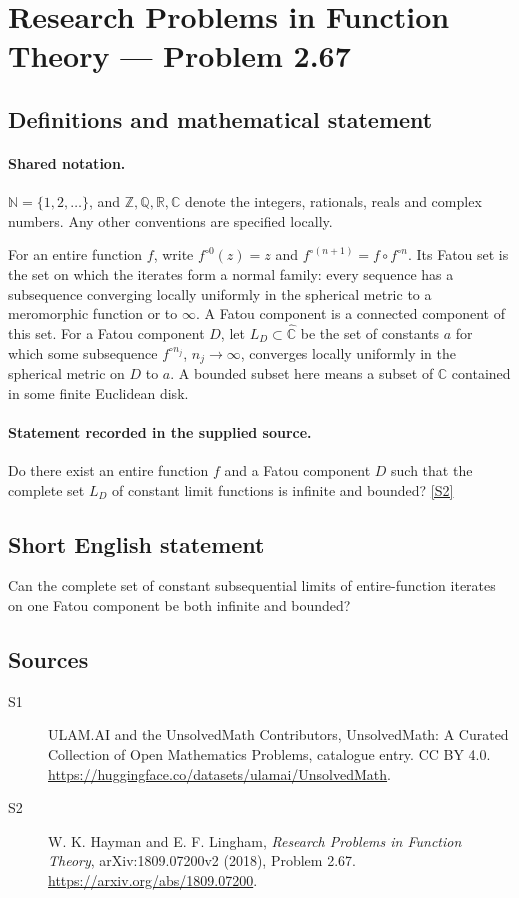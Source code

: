 \documentclass[11pt]{article}
\newcommand{\sref}[2]{\hyperlink{source:#1:#2}{[S#2]}}
\begin{document}
\section{Research Problems in Function Theory — Problem 2.67}\label{statement}

\subsection{Definitions and mathematical statement}

\paragraph{Shared notation.}$\mathbb N=\{1,2,\ldots\}$, and $\mathbb Z,\mathbb Q,\mathbb R,\mathbb C$ denote the integers, rationals, reals and complex numbers. Any other conventions are specified locally.


For an entire function $f$, write $f^{\circ0}(z)=z$ and $f^{\circ(n+1)}=f\circ f^{\circ n}$. Its Fatou set is the set on which the iterates form a normal family: every sequence has a subsequence converging locally uniformly in the spherical metric to a meromorphic function or to $\infty$. A Fatou component is a connected component of this set. For a Fatou component $D$, let $L_D\subset\widehat{\mathbb C}$ be the set of constants $a$ for which some subsequence $f^{\circ n_j}$, $n_j\to\infty$, converges locally uniformly in the spherical metric on $D$ to $a$. A bounded subset here means a subset of $\mathbb C$ contained in some finite Euclidean disk.
\paragraph{Statement recorded in the supplied source.}
Do there exist an entire function $f$ and a Fatou component $D$ such that the complete set $L_D$ of constant limit functions is infinite and bounded? \sref{statement}{2}
\subsection{Short English statement}
Can the complete set of constant subsequential limits of entire-function iterates on one Fatou component be both infinite and bounded?
\subsection{Sources}
\begin{description}
\item[\hypertarget{source:statement:1}{S1}] ULAM.AI and the UnsolvedMath Contributors, UnsolvedMath: A Curated Collection of Open Mathematics Problems, catalogue entry. CC BY 4.0. \url{https://huggingface.co/datasets/ulamai/UnsolvedMath}.
\item[\hypertarget{source:statement:2}{S2}] W. K. Hayman and E. F. Lingham, \emph{Research Problems in Function Theory}, arXiv:1809.07200v2 (2018), Problem 2.67. \url{https://arxiv.org/abs/1809.07200}.
\end{description}
\label{end:statement}
\end{document}
